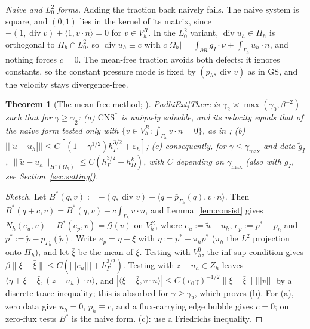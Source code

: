 \documentclass[5p,times]{elsarticle}
\newtheorem{theorem}{Theorem}
\theoremstyle{definition}
\newcommand{\hG}{h_\Gamma}
\newcommand{\hO}{h_\Omega}
\newcommand{\Gh}{\Gamma_h}
\newcommand{\Oh}{\Omega_h}
\newcommand{\VR}{V_h^R}
\newcommand{\VO}{V_h^0}
\newcommand{\Pih}{\Pi_h}
\newcommand{\Zh}{Z_h}
\newcommand{\gI}{g_I}
\newcommand{\ut}{\tilde u}
\newcommand{\pt}{\tilde p}
\newcommand{\pbG}{\bar p_{\Gamma_h}}
\newcommand{\ip}[2]{\langle #1,#2\rangle}
\newcommand{\tnorm}[1]{|\!|\!|#1|\!|\!|}
\newcommand{\norm}[1]{\lVert #1\rVert}
\newcommand{\GS}{\mathrm{GS}}
\newcommand{\CNS}{\mathrm{CNS}^\ast}
\newcommand{\eps}{\varepsilon_h}
\newcommand{\Gc}{\mathcal G}
\renewcommand{\div}{\operatorname{div}}
\newcommand{\ext}[1]{\cite[#1]{PadhiExt}}
\begin{document}
\emph{Naive and $L^2_0$ forms.}\label{prop:naive} Adding the traction back naively fails. The naive system is square, and $(0,1)$ lies in the kernel of its matrix, since $-(1,\div v)+\ip{1}{v\cdot n}=0$ for $v\in\VR$. In the $L^2_0$ variant, $\div u_h\in\Pih$ is orthogonal to $\Pih\cap L^2_0$, so $\div u_h\equiv c$ with $c|\Oh|=\int_{\partial R}\gI\cdot\nu+\int_{\Gh}u_h\cdot n$, and nothing forces $c=0$. The mean-free traction avoids both defects: it ignores constants, so the constant pressure mode is fixed by $(p_h,\div v)$ as in $\GS$, and the velocity stays divergence-free.

\begin{theorem}[The mean-free method; \ext{Thm.~7.2, Rem.~7.3}]\label{thm:cns}
There is $\gamma_2\asymp\max(\gamma_0,\beta^{-2})$ such that for $\gamma\ge\gamma_2$:
(a) $\CNS$ is uniquely solvable, and its velocity equals that of the naive form tested only with $\{v\in\VR:\int_{\Gh}v\cdot n=0\}$, as in \cite{FrachonNilssonZahedi2024};
(b) $\tnorm{\ut-u_h}\le C[(1+\gamma^{1/2})\hG^{3/2}+\eps]$;
(c) consequently, for $\gamma\le\gamma_{\max}$ and data $\tilde g_I$, $\norm{\ut-u_h}_{H^1(\Oh)}\le C(\hG^{3/2}+\hO^k)$, with $C$ depending on $\gamma_{\max}$ (also with $\gI$, see Section~\ref{sec:setting}).
\end{theorem}

\begin{proof}[Sketch]
Let $B^\ast(q,v):=-(q,\div v)+\ip{q-\pbG(q)}{v\cdot n}$. Then $B^\ast(q+c,v)=B^\ast(q,v)-c\int_{\Gh}v\cdot n$, and Lemma~\ref{lem:consist} gives $N_h(e_u,v)+B^\ast(e_p,v)=\Gc(v)$ on $\VR$, where $e_u:=\ut-u_h$, $e_p:=p^\ast-p_h$ and $p^\ast:=\pt-\pbG(\pt)$. Write $e_p=\eta+\xi$ with $\eta:=p^\ast-\pi_hp^\ast$ ($\pi_h$ the $L^2$ projection onto $\Pih$), and let $\bar\xi$ be the mean of $\xi$. Testing with $\VO$, the inf-sup condition gives $\beta\norm{\xi-\bar\xi}\le C(\tnorm{e_u}+\hG^{3/2})$. Testing with $z-u_h\in\Zh$ leaves $\ip{\eta+\xi-\bar\xi}{(z-u_h)\cdot n}$, and $|\ip{\xi-\bar\xi}{v\cdot n}|\le C(c_0\gamma)^{-1/2}\norm{\xi-\bar\xi}\tnorm v$ by a discrete trace inequality; this is absorbed for $\gamma\ge\gamma_2$, which proves (b). For (a), zero data give $u_h=0$, $p_h\equiv c$, and a flux-carrying edge bubble gives $c=0$; on zero-flux tests $B^\ast$ is the naive form. (c): use a Friedrichs inequality.
\end{proof}
\end{document}
